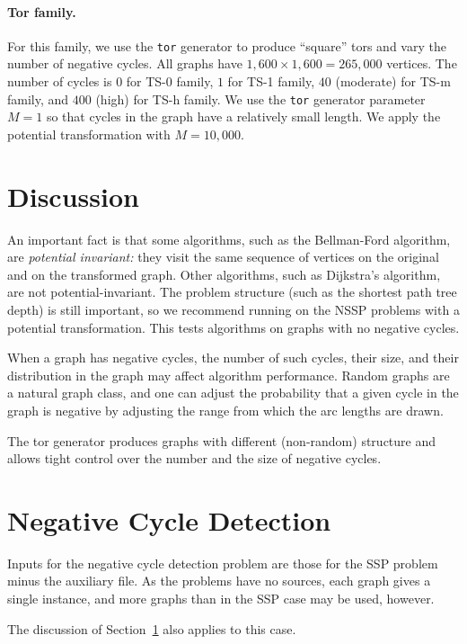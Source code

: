 \documentclass[11pt]{article}
\begin{document}
\paragraph{Tor family.}
For this family, we use the {\tt tor} generator to produce ``square''
tors and vary the number of negative cycles.
All graphs have $1,600 \times 1,600 = 265,000$ vertices.
The number of cycles is $0$ for TS-0 family, $1$ for TS-1 family,
$40$ (moderate) for TS-m family, and $400$ (high) for TS-h family.
We use the {\tt tor} generator parameter $M = 1$ so that cycles
in the graph have a relatively small length.
We apply the potential transformation with $M = 10,000$.

\section{Discussion}
\label{sec:ssp-d}

An important fact is that some algorithms, such as the
Bellman-Ford algorithm, are {\em potential invariant:} they visit
the same sequence of vertices on the original and on the transformed graph.
Other algorithms, such as Dijkstra's algorithm, are not potential-invariant.
The problem structure (such as the shortest path tree depth) is still
important, so we recommend running on the NSSP problems 
with a potential transformation.
This tests algorithms on graphs with no negative cycles.

When a graph has negative cycles, the number of such cycles, their size,
and their distribution in the graph may affect algorithm performance.
Random graphs are a natural graph class, and one can adjust the
probability that a given cycle in the graph is negative by adjusting
the range from which the arc lengths are drawn.

The tor generator produces graphs with different (non-random) structure
and allows tight control over the number and the size of negative
cycles.

\section{Negative Cycle Detection}

Inputs for the negative cycle detection problem are those for the
SSP problem minus the auxiliary file.
As the problems have no sources, each graph gives a single instance, and
more graphs than in the SSP case may be used, however.

The discussion of Section~\ref{sec:ssp-d} also applies to this case.
\end{document}
